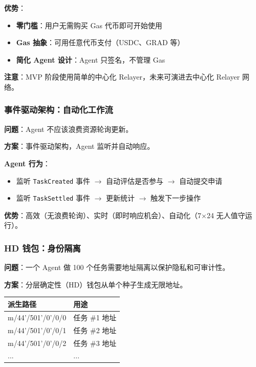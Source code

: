 \documentclass[11pt,a4paper]{article}
\begin{document}
\textbf{优势}：
\begin{itemize}[leftmargin=2em]
\item \textbf{零门槛}：用户无需购买 Gas 代币即可开始使用
\item \textbf{Gas 抽象}：可用任意代币支付（USDC、GRAD 等）
\item \textbf{简化 Agent 设计}：Agent 只签名，不管理 Gas
\end{itemize}

\textbf{注意}：MVP 阶段使用简单的中心化 Relayer，未来可演进去中心化 Relayer 网络。

\subsubsection{事件驱动架构：自动化工作流}

\textbf{问题}：Agent 不应该浪费资源轮询更新。

\textbf{方案}：事件驱动架构，Agent 监听并自动响应。

\textbf{Agent 行为}：
\begin{itemize}[leftmargin=2em]
\item 监听 \texttt{TaskCreated} 事件 $\to$ 自动评估是否参与 $\to$ 自动提交申请
\item 监听 \texttt{TaskSettled} 事件 $\to$ 更新统计 $\to$ 触发下一步操作
\end{itemize}

\textbf{优势}：高效（无浪费轮询）、实时（即时响应机会）、自动化（7×24 无人值守运行）。

\subsubsection{HD 钱包：身份隔离}

\textbf{问题}：一个 Agent 做 100 个任务需要地址隔离以保护隐私和可审计性。

\textbf{方案}：分层确定性（HD）钱包从单个种子生成无限地址。

\begin{center}
\small
\begin{tabular}{@{}ll@{}}
\toprule
\textbf{派生路径} & \textbf{用途} \\
\midrule
m/44'/501'/0'/0/0 & 任务 \#1 地址 \\
m/44'/501'/0'/0/1 & 任务 \#2 地址 \\
m/44'/501'/0'/0/2 & 任务 \#3 地址 \\
... & ... \\
\bottomrule
\end{tabular}
\end{center}
\end{document}
